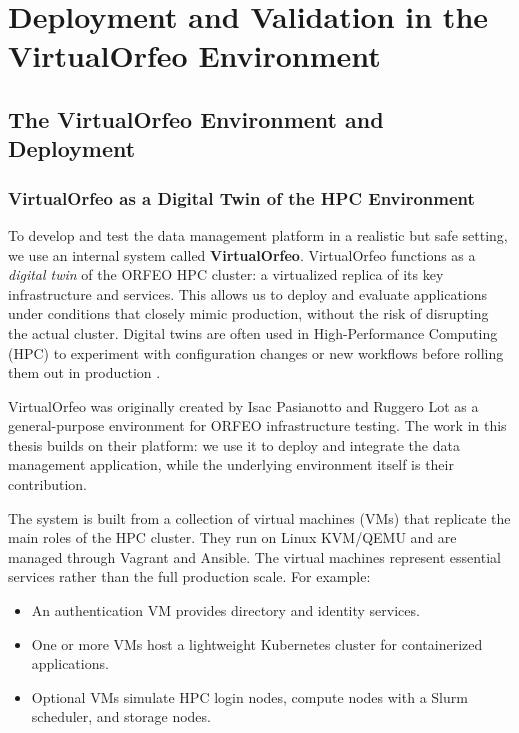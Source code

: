 \chapter{Deployment and Validation in the VirtualOrfeo Environment}\label{chap:virtualorfeo-deployment}

\section{The VirtualOrfeo Environment and Deployment}

\subsection{VirtualOrfeo as a Digital Twin of the HPC Environment}

To develop and test the data management platform in a realistic but safe setting, we use an internal system called \textbf{VirtualOrfeo}. VirtualOrfeo functions as a \emph{digital twin} of the ORFEO HPC cluster: a virtualized replica of its key infrastructure and services. This allows us to deploy and evaluate applications under conditions that closely mimic production, without the risk of disrupting the actual cluster. Digital twins are often used in High-Performance Computing (HPC) to experiment with configuration changes or new workflows before rolling them out in production \parencite{Ohmura2023TwdsDT}.

VirtualOrfeo was originally created by Isac Pasianotto and Ruggero Lot as a general-purpose environment for ORFEO infrastructure testing. The work in this thesis builds on their platform: we use it to deploy and integrate the data management application, while the underlying environment itself is their contribution.

The system is built from a collection of virtual machines (VMs) that replicate the main roles of the HPC cluster. They run on Linux KVM/QEMU and are managed through Vagrant and Ansible. The virtual machines represent essential services rather than the full production scale. For example:  

\begin{itemize}
	\item An authentication VM provides directory and identity services.  
	\item One or more VMs host a lightweight Kubernetes cluster for containerized applications.  
	\item Optional VMs simulate HPC login nodes, compute nodes with a Slurm scheduler, and storage nodes.  
\end{itemize}

